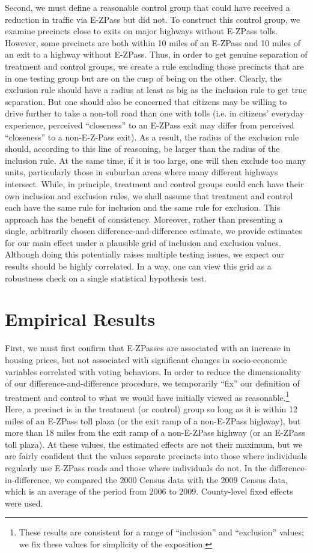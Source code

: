 \documentclass[11.0pt]{article}
\theoremstyle{definition}
\begin{document}
Second, we must define a reasonable control group that could have received a reduction in traffic via E-ZPass but did not. To construct this control group, we examine precincts close to exits on major highways without E-ZPass tolls. However, some precincts are both within 10 miles of an E-ZPass and 10 miles of an exit to a highway without E-ZPass. Thus, in order to get genuine separation of treatment and control groups, we create a rule excluding those precincts that are in one testing group but are on the cusp of being on the other. Clearly, the exclusion rule should have a radius at least as big as the inclusion rule to get true separation. But one should also be concerned that citizens may be willing to drive further to take a non-toll road than one with tolls (i.e. in citizens' everyday experience, perceived ``closeness'' to an E-ZPass exit may differ from perceived ``closeness'' to a non-E-Z-Pass exit). As a result, the radius of the exclusion rule should, according to this line of reasoning, be larger than the radius of the inclusion rule. At the same time, if it is too large, one will then exclude too many units, particularly those in suburban areas where many different highways intersect. While, in principle, treatment and control groups could each have their own inclusion and exclusion rules, we shall assume that treatment and control each have the same rule for inclusion and the same rule for exclusion. This approach has the benefit of consistency. Moreover, rather than presenting a single, arbitrarily chosen difference-and-difference estimate, we provide estimates for our main effect under a plausible grid of inclusion and exclusion values. Although doing this potentially raises multiple testing issues, we expect our results should be highly correlated. In a way, one can view this grid as a robustness check on a single statistical hypothesis test.

\section{Empirical Results}
First, we must first confirm that E-ZPasses are associated with an increase in housing prices, but not associated with significant changes in socio-economic variables correlated with voting behaviors. In order to reduce the dimensionality of our difference-and-difference procedure, we temporarily ``fix'' our definition of treatment and control to what we would have initially viewed as reasonable.\footnote{These results are consistent for a range of ``inclusion'' and ``exclusion'' values; we fix these values for simplicity of the exposition.} Here, a precinct is in the treatment (or control) group so long as it is within 12 miles of an E-ZPass toll plaza (or the exit ramp of a non-E-ZPass highway), but more than 18 miles from the exit ramp of a non-E-ZPass highway (or an E-ZPass toll plaza). At these values, the estimated effects are not their maximum, but we are fairly confident that the values separate precincts into those where individuals regularly use E-ZPass roads and those where individuals do not. In the difference-in-difference, we compared the 2000 Census data with the 2009 Census data, which is an average of the period from 2006 to 2009. County-level fixed effects were used. 
\end{document}
